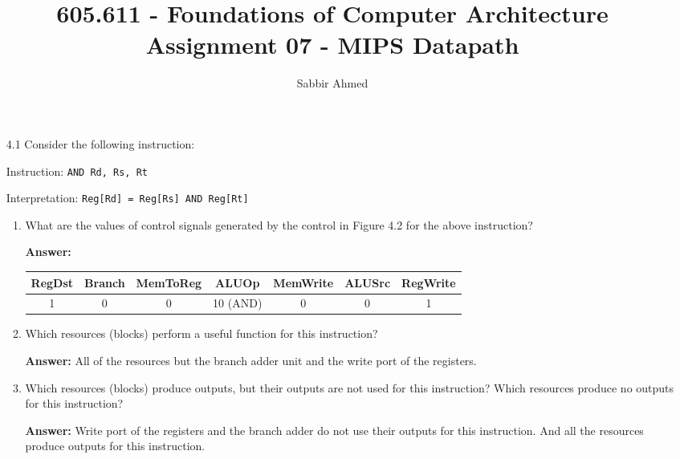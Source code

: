 \documentclass[12pt]{article}
\begin{document}
  \title{605.611 - Foundations of Computer Architecture \\ Assignment 07 - MIPS Datapath\vspace{-0.5em}}
  \author{Sabbir Ahmed}
  \maketitle
  \vspace{-1em}

  \begin{enumerate}

  \item[4.1] Consider the following instruction:

  Instruction: \texttt{AND Rd, Rs, Rt}

  Interpretation: \texttt{Reg[Rd] = Reg[Rs] AND Reg[Rt]}

  \begin{enumerate}[label=4.1.\arabic*]
    \item What are the values of control signals generated by the control in Figure 4.2 for the above instruction?

    \textbf{Answer:}

    \begin{center}
      \begin{tabular}{|c|c|c|c|c|c|c|}
      \hline
      RegDst & Branch & MemToReg & ALUOp & MemWrite & ALUSrc & RegWrite \\
      \hline
      1 & 0 & 0 & 10 (AND) & 0 & 0 & 1 \\
      \hline
      \end{tabular}
    \end{center}

    \item Which resources (blocks) perform a useful function for this instruction?

    \textbf{Answer:} All of the resources but the branch adder unit and the write port of the registers.

    \item Which resources (blocks) produce outputs, but their outputs are not used for this instruction? Which resources produce no outputs for this instruction?

    \textbf{Answer:} Write port of the registers and the branch adder do not use their outputs for this instruction. And all the resources produce outputs for this instruction.

  \end{enumerate}


\end{enumerate}
\end{document}
